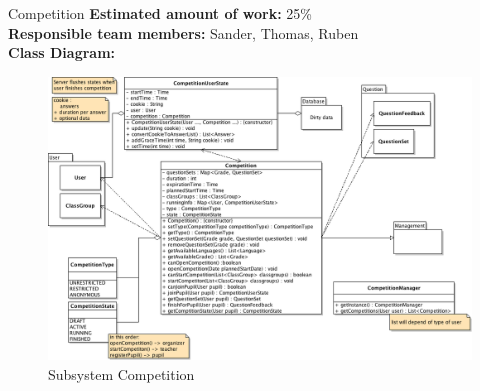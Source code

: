 \begin{subsection}{Competition}
	\textbf{Estimated amount of work:} 25\% \\
	\textbf{Responsible team members:} Sander, Thomas, Ruben \\
	\textbf{Class Diagram:} \\
	
	\begin{figure}[!h]
	  \centering
		\includegraphics[width=1\textwidth]{../class_diagrams/competition.png}
	  \caption{Subsystem Competition}
	  \label{subsystem_competition}
	\end{figure}
	
\end{subsection}